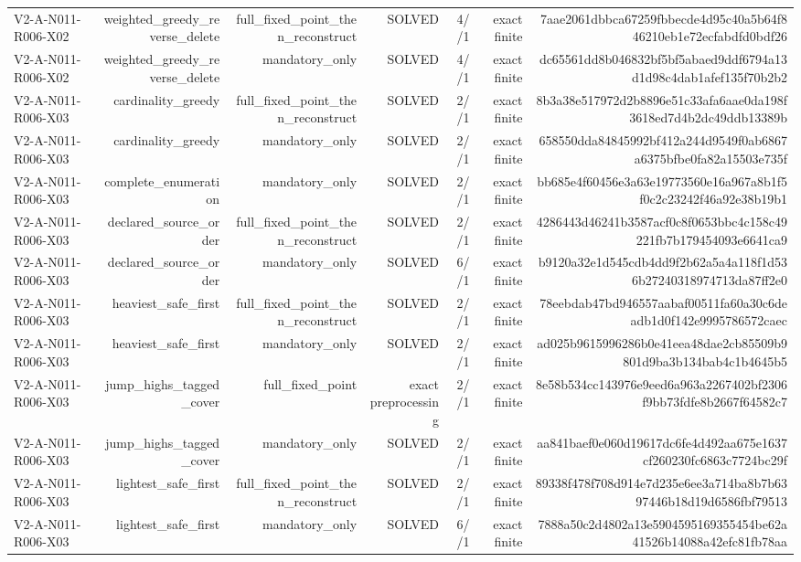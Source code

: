 {\begin{longtable}{lrrrrrr}
V2-A-N011-R006-X02 & weighted\_greedy\_reverse\_delete & full\_fixed\_point\_then\_reconstruct & SOLVED & 4//1 & exact finite & 7aae2061dbbca67259fbbecde4d95c40a5b64f846210eb1e72ecfabdfd0bdf26 \\
V2-A-N011-R006-X02 & weighted\_greedy\_reverse\_delete & mandatory\_only & SOLVED & 4//1 & exact finite & dc65561dd8b046832bf5bf5abaed9ddf6794a13d1d98c4dab1afef135f70b2b2 \\
V2-A-N011-R006-X03 & cardinality\_greedy & full\_fixed\_point\_then\_reconstruct & SOLVED & 2//1 & exact finite & 8b3a38e517972d2b8896e51c33afa6aae0da198f3618ed7d4b2dc49ddb13389b \\
V2-A-N011-R006-X03 & cardinality\_greedy & mandatory\_only & SOLVED & 2//1 & exact finite & 658550dda84845992bf412a244d9549f0ab6867a6375bfbe0fa82a15503e735f \\
V2-A-N011-R006-X03 & complete\_enumeration & mandatory\_only & SOLVED & 2//1 & exact finite & bb685e4f60456e3a63e19773560e16a967a8b1f5f0c2c23242f46a92e38b19b1 \\
V2-A-N011-R006-X03 & declared\_source\_order & full\_fixed\_point\_then\_reconstruct & SOLVED & 2//1 & exact finite & 4286443d46241b3587acf0c8f0653bbc4c158c49221fb7b179454093e6641ca9 \\
V2-A-N011-R006-X03 & declared\_source\_order & mandatory\_only & SOLVED & 6//1 & exact finite & b9120a32e1d545cdb4dd9f2b62a5a4a118f1d536b27240318974713da87ff2e0 \\
V2-A-N011-R006-X03 & heaviest\_safe\_first & full\_fixed\_point\_then\_reconstruct & SOLVED & 2//1 & exact finite & 78eebdab47bd946557aabaf00511fa60a30c6deadb1d0f142e9995786572caec \\
V2-A-N011-R006-X03 & heaviest\_safe\_first & mandatory\_only & SOLVED & 2//1 & exact finite & ad025b9615996286b0e41eea48dae2cb85509b9801d9ba3b134bab4c1b4645b5 \\
V2-A-N011-R006-X03 & jump\_highs\_tagged\_cover & full\_fixed\_point & exact preprocessing & 2//1 & exact finite & 8e58b534cc143976e9eed6a963a2267402bf2306f9bb73fdfe8b2667f64582c7 \\
V2-A-N011-R006-X03 & jump\_highs\_tagged\_cover & mandatory\_only & SOLVED & 2//1 & exact finite & aa841baef0e060d19617dc6fe4d492aa675e1637cf260230fc6863c7724bc29f \\
V2-A-N011-R006-X03 & lightest\_safe\_first & full\_fixed\_point\_then\_reconstruct & SOLVED & 2//1 & exact finite & 89338f478f708d914e7d235e6ee3a714ba8b7b6397446b18d19d6586fbf79513 \\
V2-A-N011-R006-X03 & lightest\_safe\_first & mandatory\_only & SOLVED & 6//1 & exact finite & 7888a50c2d4802a13e5904595169355454be62a41526b14088a42efc81fb78aa \\

\end{longtable}}

